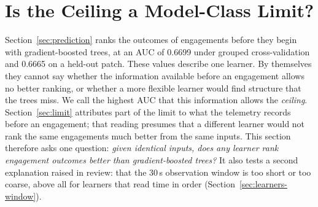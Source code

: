%

\section{Is the Ceiling a Model-Class Limit?}
\label{sec:learners}

Section~\ref{sec:prediction} ranks the outcomes of engagements before they begin with gradient-boosted
trees, at an AUC of 0.6699 under grouped cross-validation and 0.6665 on a held-out patch. These values
describe one learner. By themselves they cannot say whether the information available before an
engagement allows no better ranking, or whether a more flexible learner would find structure that the
trees miss. We call the highest AUC that this information allows the \emph{ceiling}.
Section~\ref{sec:limit} attributes part of the limit to what the telemetry records before an engagement;
that reading presumes that a different learner would not rank the same engagements much better from the
same inputs. This section therefore asks one question: \emph{given identical inputs, does any learner rank
engagement outcomes better than gradient-boosted trees?} It also tests a second explanation raised in
review: that the 30\,s observation window is too short or too coarse, above all for learners that read
time in order (Section~\ref{sec:learners-window}).

